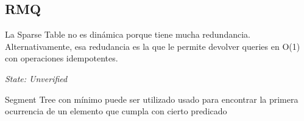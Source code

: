 \subsection{RMQ}

La Sparse Table no es dinámica porque tiene mucha redundancia. Alternativamente, esa redudancia es la que le permite devolver queries en O(1) con operaciones idempotentes.

\textit{State: Unverified}

Segment Tree con mínimo puede ser utilizado usado para encontrar la primera ocurrencia de un elemento que cumpla con cierto predicado
